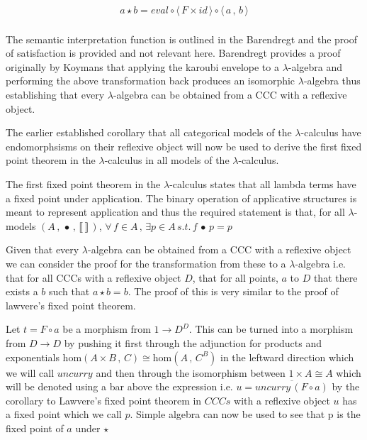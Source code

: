 \documentclass[a4paper,10pt]{article}
\begin{document}
\begin{align*}
    a \star b = eval \circ \langle \, F \times id \, \rangle \circ \langle \, a \,
    , \, b \, \rangle
\end{align*}
\\
The semantic interpretation function is outlined in the Barendregt and the proof
of satisfaction is provided and not relevant here. Barendregt provides a proof
originally by Koymans that applying the karoubi envelope to a $\lambda$-algebra
and performing the above transformation back produces an isomorphic
$\lambda$-algebra thus establishing that every $\lambda$-algebra can be obtained
from a CCC with a reflexive object.

The earlier established corollary that all categorical models of the
$\lambda$-calculus have endomorphsisms on their reflexive object will now be
used to derive the first fixed point theorem in the $\lambda$-calculus in all
models of the $\lambda$-calculus.

The first fixed point theorem in the $\lambda$-calculus states that all lambda
terms have a fixed point under application. The binary operation of applicative
structures is meant to represent application and thus the required statement is
that, for all $\lambda$-models $(A \, , \, \bullet \, , \, \llbracket \,
\rrbracket \, )$,
$\forall \, f \in A \, , \, \exists p \in A \, s.t. \, f \, \bullet \, p = p$

Given that every $\lambda$-algebra can be obtained from a CCC with a reflexive
object we can consider the proof for the transformation from these to a
$\lambda$-algebra i.e. that for all CCCs with a reflexive object $D$, that
for all points, $a$ to $D$ that there exists a $b$ such that $a \star b = b$.
The proof of this is very similar to the proof of lawvere's fixed point theorem.

Let $t = F \circ a $ be a morphism from $1 \rightarrow D^D$. This can be turned
into a morphism from $D \rightarrow D$ by pushing it first through the
adjunction for products and exponentials $\textrm{hom}(A \times B \, , \, C)
\cong \textrm{hom}(A \, , \, C^B)$ in the leftward direction which we will call
$uncurry$ and then through the isomorphism between $1 \times A \cong A$ which
will be denoted using a bar above the expression i.e. $u = \overline{uncurry\, (
F \circ a)}$ by the corollary to Lawvere's fixed point theorem in $CCCs$ with a
reflexive object $u$ has a fixed point which we call $p$. Simple algebra can now
be used to see that p is the fixed point of $a$ under $\star$
\end{document}
